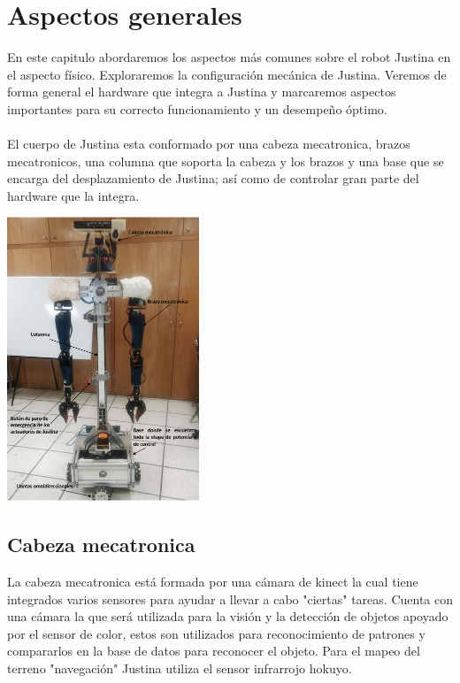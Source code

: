 \documentclass[user_manual.tex]{subfiles}
\begin{document}
 \chapter{Aspectos generales}
En este capitulo abordaremos los aspectos más comunes sobre el robot Justina en el aspecto físico. Exploraremos la configuración 
mecánica de Justina. Veremos de forma general el hardware que integra a Justina y marcaremos aspectos importantes para su
correcto funcionamiento y un desempeño óptimo.\\
\\
El cuerpo de Justina esta conformado por una cabeza mecatronica, brazos mecatronicos, una columna que soporta la cabeza y 
los brazos y una base que se encarga del desplazamiento de Justina; así como de controlar gran parte del hardware que la 
integra.


\begin{center}
\includegraphics[width=0.43\textwidth]{Figures/Hardware/Diagramas/Cuerpo.png}
\label{fig:Hardware:Diagramas:Justina:Completa}
\end{center}
\section{Cabeza mecatronica}
 La cabeza mecatronica está formada por una cámara de kinect la cual tiene integrados varios sensores para ayudar a
 llevar a cabo "ciertas" tareas. Cuenta con una cámara la que será utilizada para la visión y la detección de objetos
 apoyado por el sensor de color, estos son utilizados para reconocimiento de patrones y compararlos en la base de datos
 para reconocer el objeto. Para el mapeo del terreno "navegación" Justina utiliza el sensor infrarrojo hokuyo.
\end{document}
